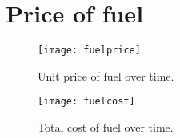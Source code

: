 \documentclass[12pt, a4paper]{article}
\begin{document}
\section{Price of fuel}
\label{s:cost}

\begin{figure} [htbp]
  \centering
  \texttt{[image: fuelprice]}
  \caption{Unit price of fuel over time.}
  \label{f:unit}
\end{figure}

\begin{figure} [htbp]
  \centering
  \texttt{[image: fuelcost]}
  \caption{Total cost of fuel over time.}
  \label{f:cost}
\end{figure}



%
%
%
\end{document}
